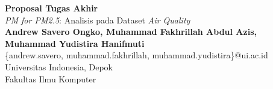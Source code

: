 \documentclass{article}
\begin{document}
    \begin{center}
        
		\LARGE{\textbf{Proposal Tugas Akhir}} \\
        \vspace{1em}
        \Large{\textit{PM for PM2.5}: Analisis pada Dataset \textit{Air Quality}} \\
        \vspace{1em}
        \normalsize\textbf{Andrew Savero Ongko, Muhammad Fakhrillah Abdul Azis,} \\
        \normalsize\textbf{Muhammad Yudistira Hanifmuti} \\
        \normalsize{\{andrew.savero, muhammad.fakhrillah, muhammad.yudistira\}@ui.ac.id} \\
        \vspace{1em}
        \normalsize{Universitas Indonesia, Depok} \\
        \normalsize{Fakultas Ilmu Komputer}

	\end{center}
\end{document}
